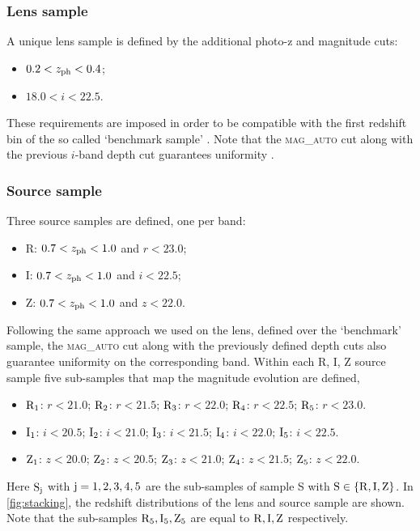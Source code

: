 \subsubsection{Lens sample}
A unique lens sample is defined by the additional photo-z and magnitude cuts:
\begin{itemize}
	\item $0.2 < z_{\rm ph} < 0.4$;
	\item $18.0 < i < 22.5$.
\end{itemize}
These requirements are imposed in order to be compatible with the first redshift bin of the so called `benchmark sample' \cite{2016MNRAS.455.4301C}. Note that the {\scshape mag\_auto} cut along with the previous $i$-band depth cut guarantees uniformity \cite{2016MNRAS.455.4301C}.

\subsubsection{Source sample}
Three source samples are defined, one per band:
\begin{itemize}
	\item R: $0.7 < z_{\rm ph} < 1.0$ and $r<23.0$;
	\item I: $0.7 < z_{\rm ph} < 1.0$ and $i<22.5$;
	\item Z: $0.7 < z_{\rm ph} < 1.0$ and $z<22.0$.
\end{itemize}

Following the same approach we used on the lens, defined over the `benchmark' sample, the {\scshape mag\_auto} cut along with the previously defined depth cuts also guarantee uniformity on the corresponding band. Within each R, I, Z source sample five sub-samples that map the magnitude evolution are defined,
\begin{itemize}
	\item $\rm R_1$: $r<21.0$; $\rm R_2$: $r<21.5$; $\rm R_3$: $r<22.0$; $\rm R_4$: $r<22.5$; $\rm R_5$: $r<23.0$.
	\item $\rm I_1$: $i<20.5$; $\rm I_2$: $i<21.0$; $\rm I_3$: $i<21.5$; $\rm I_4$: $i<22.0$; $\rm I_5$: $i<22.5$.
	\item $\rm Z_1$: $z<20.0$; $\rm Z_2$: $z<20.5$; $\rm Z_3$: $z<21.0$; $\rm Z_4$: $z<21.5$; $\rm Z_5$: $z<22.0$.
\end{itemize}
Here $\rm S_j$ with $\rm j=1,2,3,4,5$ are the sub-samples of sample S with $\rm S\in \{R,I,Z\}$. In \autoref{fig:stacking}, the redshift distributions of the lens and source sample are shown. Note that the sub-samples $\rm R_5, I_5, Z_5$ are equal to $\rm R, I , Z$ respectively.
\newline

